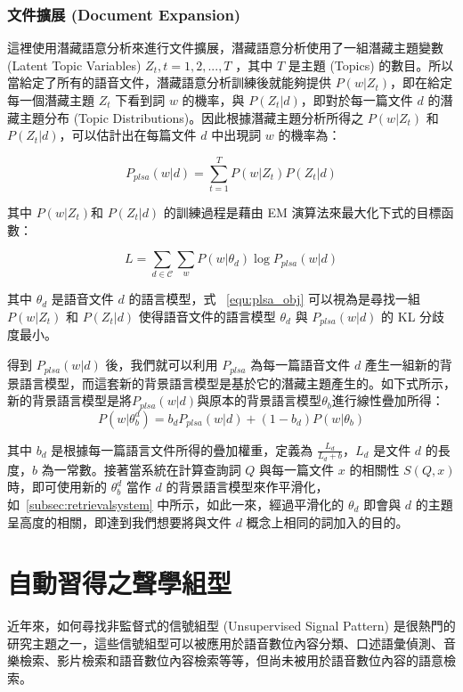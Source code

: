\subsubsection{文件擴展 (Document Expansion)}
\label{sec:doc_exp}
這裡使用潛藏語意分析來進行文件擴展，潛藏語意分析使用了一組潛藏主題變數 (Latent Topic Variables) ${Z_t, t = 1, 2, ..., T}$ ，其中 $T$ 是主題 (Topics) 的數目。所以當給定了所有的語音文件，潛藏語意分析訓練後就能夠提供 $P(w|Z_t)$，即在給定每一個潛藏主題 $Z_t$ 下看到詞 $w$ 的機率，與 $P(Z_t|d)$，即對於每一篇文件 $d$ 的潛藏主題分布 (Topic Distributions)。因此根據潛藏主題分析所得之 $P(w|Z_t)$ 和 $P(Z_t|d)$，可以估計出在每篇文件 $d$ 中出現詞 $w$ 的機率為：

\begin{equation}
P_{plsa}(w|d) = \sum_{t=1}^T P(w|Z_t)P(Z_t|d)
\end{equation}

其中 $P(w|Z_t)$和 $P(Z_t|d)$ 的訓練過程是藉由 EM 演算法來最大化下式的目標函數：

\begin{equation}
\label{equ:plsa_obj}
L=\sum_{d \in \mathcal{C}} \sum_w P(w|\theta_d) \log P_{plsa}(w|d)
\end{equation}

其中 $\theta_d$ 是語音文件 $d$ 的語言模型，式 ~\ref{equ:plsa_obj} 可以視為是尋找一組 $P(w|Z_t)$ 和 $P(Z_t|d)$ 使得語音文件的語言模型 $\theta_d$ 與 $P_{plsa}(w|d)$ 的 KL 分歧度最小。 

得到 $P_{plsa}(w|d)$ 後，我們就可以利用 $P_{plsa}$ 為每一篇語音文件 $d$ 產生一組新的背景語言模型，而這套新的背景語言模型是基於它的潛藏主題產生的。如下式所示，新的背景語言模型是將$P_{plsa}(w|d)$與原本的背景語言模型$\theta_b$進行線性疊加所得：
\begin{equation}
P(w|\theta_b^d) = b_dP_{plsa}(w|d) + (1-b_d)P(w|\theta_b)
\end{equation}

其中 $b_d$ 是根據每一篇語言文件所得的疊加權重，定義為 $\frac{L_d}{L_d+b}$，$L_d$ 是文件 $d$ 的長度，$b$ 為一常數。接著當系統在計算查詢詞 $Q$ 與每一篇文件 $x$ 的相關性 $S(Q, x)$ 時，即可使用新的 $\theta_b^d$ 當作 $d$ 的背景語言模型來作平滑化，如~\ref{subsec:retrievalsystem} 中所示，如此一來，經過平滑化的 $\theta_d$ 即會與 $d$ 的主題呈高度的相關，即達到我們想要將與文件 $d$ 概念上相同的詞加入的目的。

\section{自動習得之聲學組型}
\label{sec:chap2_ap}
近年來，如何尋找非監督式的信號組型 (Unsupervised Signal Pattern) 是很熱門的研究主題之一，這些信號組型可以被應用於語音數位內容分類、口述語彙偵測、音樂檢索、影片檢索和語音數位內容檢索等等，但尚未被用於語音數位內容的語意檢索。

